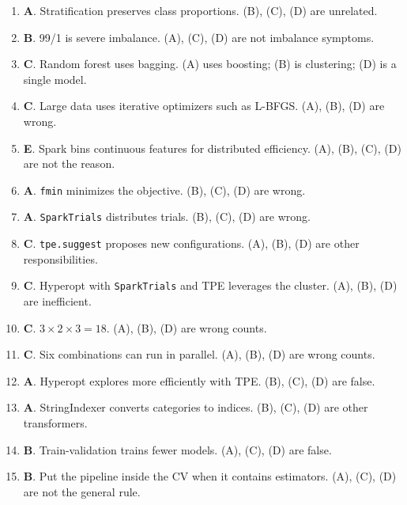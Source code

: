 \documentclass[11pt]{article}
\begin{document}
\begin{enumerate}[leftmargin=*, label=\textbf{Q\arabic*.}]
		\item \textbf{A}. Stratification preserves class proportions. (B), (C), (D) are unrelated.
		
		\item \textbf{B}. 99/1 is severe imbalance. (A), (C), (D) are not imbalance symptoms.
		
		\item \textbf{C}. Random forest uses bagging. (A) uses boosting; (B) is clustering; (D) is a single model.
		
		\item \textbf{C}. Large data uses iterative optimizers such as L-BFGS. (A), (B), (D) are wrong.
		
		\item \textbf{E}. Spark bins continuous features for distributed efficiency. (A), (B), (C), (D) are not the reason.
		
		\item \textbf{A}. \texttt{fmin} minimizes the objective. (B), (C), (D) are wrong.
		
		\item \textbf{A}. \texttt{SparkTrials} distributes trials. (B), (C), (D) are wrong.
		
		\item \textbf{C}. \texttt{tpe.suggest} proposes new configurations. (A), (B), (D) are other responsibilities.
		
		\item \textbf{C}. Hyperopt with \texttt{SparkTrials} and TPE leverages the cluster. (A), (B), (D) are inefficient.
		
		\item \textbf{C}. $3 \times 2 \times 3 = 18$. (A), (B), (D) are wrong counts.
		
		\item \textbf{C}. Six combinations can run in parallel. (A), (B), (D) are wrong counts.
		
		\item \textbf{A}. Hyperopt explores more efficiently with TPE. (B), (C), (D) are false.
		
		\item \textbf{A}. StringIndexer converts categories to indices. (B), (C), (D) are other transformers.
		
		\item \textbf{B}. Train-validation trains fewer models. (A), (C), (D) are false.
		
		\item \textbf{B}. Put the pipeline inside the CV when it contains estimators. (A), (C), (D) are not the general rule.
		

\end{enumerate}
\end{document}
